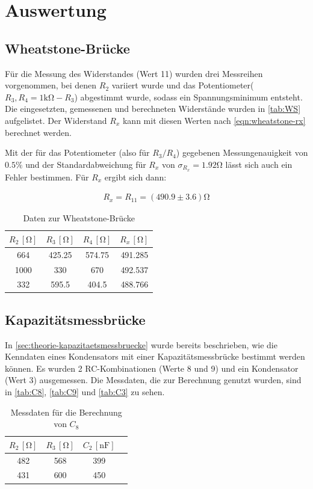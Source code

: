 \section{Auswertung}
\label{sec:Auswertung}

\subsection{Wheatstone-Brücke}
Für die Messung des Widerstandes (Wert 11) wurden drei Messreihen vorgenommen, bei denen $R_2$ variiert wurde und das Potentiometer($R_3, R_4=1\si{\kilo}\si{\ohm}-R_3$) abgestimmt wurde, sodass ein Spannungsminimum entsteht. Die eingesetzten, gemessenen und berechneten  Widerstände wurden in \autoref{tab:WS} aufgelistet. Der Widerstand $R_x$ kann mit diesen Werten nach \autoref{eqn:wheatstone-rx} berechnet werden.

Mit der für das Potentiometer (also für $R_3/R_4$) gegebenen Messungenauigkeit von $0.5\%$ und der Standardabweichung für $R_x$ von $\sigma_{R_x}=1.92 \si{\ohm}$ lässt sich auch ein Fehler bestimmen. Für $R_x$ ergibt sich dann: 

\begin{align}
  R_x=R_{11}=(490.9 \pm 3.6)\si{\ohm}
\end{align}

\begin{table}
  \centering
  \caption{Daten zur Wheatstone-Brücke}
  \label{tab:WS}
  \begin{tabular}{c c c c}
  \toprule
  $R_2 \, [\si{\ohm}]$ &$R_3 \, [\si{\ohm}]$ &$R_4 \, [\si{\ohm}]$ & $R_x \, [\si{\ohm}]$\\
  \midrule
   664 & 425.25 & 574.75& 491.285\\
   1000 & 330 & 670 & 492.537 \\
   332 & 595.5 & 404.5 & 488.766 \\
  \bottomrule
  \end{tabular}
\end{table}
\subsection{Kapazitätsmessbrücke}
\label{sec:akap}
In \autoref{sec:theorie-kapazitaetsmessbruecke} wurde bereits beschrieben, wie die Kenndaten eines Kondensators mit einer Kapazitätsmessbrücke bestimmt werden können. Es wurden 2 RC-Kombinationen (Werte 8 und 9) und ein Kondensator (Wert 3) ausgemessen. Die Messdaten, die zur Berechnung genutzt wurden, sind in \autoref{tab:C8}, \autoref{tab:C9} und \autoref{tab:C3} zu sehen. 
\begin{table}
  \centering
  \caption{Messdaten für die Berechnung von $C_8$}
  \label{tab:C8}
  \begin{tabular}{c c c c}
  \toprule
  $R_2 \, [\si{\ohm}]$ &$R_3 \, [\si{\ohm}]$ &$C_2 \, [\si{\nano} \si{\farad}]$\\
  \midrule
  482 & 568 & 399 \\
  431  & 600 & 450 \\ 
  \bottomrule
\end{tabular}
\end{table}

